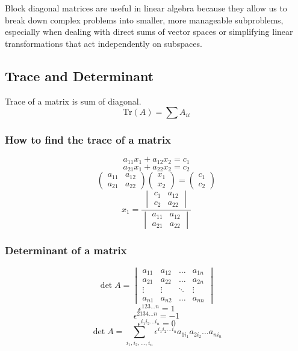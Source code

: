 \documentclass[11pt, a4paper]{report}
\begin{document}
Block diagonal matrices are useful in linear algebra because they allow us to break down complex problems into smaller, more manageable subproblems, especially when dealing with direct sums of vector spaces or simplifying linear transformations that act independently on subspaces.

\subsection{Trace and Determinant}
Trace of a matrix is sum of diagonal.
$$
\text{Tr}(A) = \sum A_{ii}
$$
\subsubsection{How to find the trace of a matrix}
$$
a_{11}x_1+a_{12}x_2 = c_1
$$
$$
a_{21}x_1+a_{22}x_2 = c_2
$$
$$
\begin{pmatrix}
a_{11} & a_{12} \\
a_{21} & a_{22}
\end{pmatrix}
\begin{pmatrix}
x_1 \\ x_2
\end{pmatrix}
=
\begin{pmatrix}
c_1 \\ c_2
\end{pmatrix}
$$
$$
x_1 = \frac{
\begin{vmatrix}
c_1 & a_{12} \\
c_2 & a_{22}
\end{vmatrix}
}{
\begin{vmatrix}
a_{11} & a_{12} \\
a_{21} & a_{22}
\end{vmatrix}
}
$$
\subsubsection{Determinant of a matrix}
$$
\det A =
\begin{vmatrix}
a_{11} & a_{12} & \dots & a_{1n} \\
a_{21} & a_{22} & \dots & a_{2n} \\
\vdots & \vdots & \ddots & \vdots \\
a_{n1} & a_{n2} & \dots & a_{nn}
\end{vmatrix}
$$
$$
\epsilon^{123\dots n} = 1
$$
$$
\epsilon^{2134\dots n} = -1
$$
$$
\epsilon^{i_1 i_2 \dots i_n} = 0
$$
$$
\det A = \sum_{i_1, i_2, \dots, i_n} \epsilon^{i_1 i_2 \dots i_n} a_{1 i_1} a_{2 i_2} \dots a_{n i_n}
$$
\end{document}
